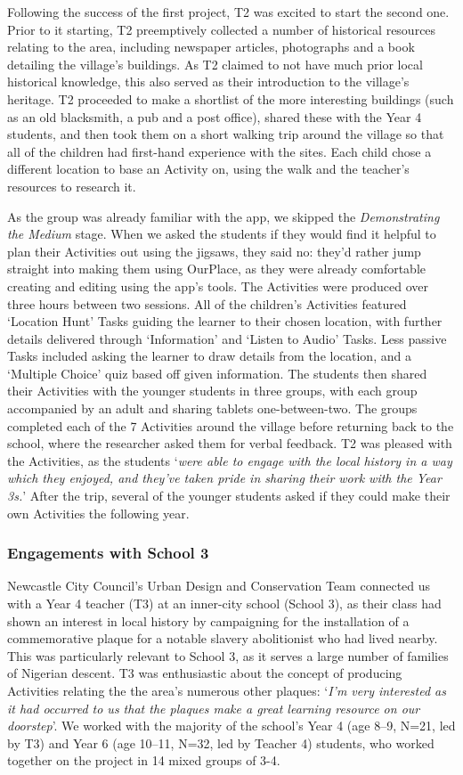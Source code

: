 \documentclass[,hyphens]{sigchi}
\begin{document}
Following the success of the first project, T2 was excited to start the second one. Prior to it starting, T2 preemptively collected a number of historical resources relating to the area, including newspaper articles, photographs and a book detailing the village's buildings. As T2 claimed to not have much prior local historical knowledge, this also served as their introduction to the village's heritage. T2 proceeded to make a shortlist of the more interesting buildings (such as an old blacksmith, a pub and a post office), shared these with the Year 4 students, and then took them on a short walking trip around the village so that all of the children had first-hand experience with the sites. Each child chose a different location to base an Activity on, using the walk and the teacher's resources to research it.

As the group was already familiar with the app, we skipped the \textit{Demonstrating the Medium} stage. When we asked the students if they would find it helpful to plan their Activities out using the jigsaws, they said no: they'd rather jump straight into making them using OurPlace, as they were already comfortable creating and editing using the app's tools. The Activities were produced over three hours between two sessions. All of the children's Activities featured `Location Hunt' Tasks guiding the learner to their chosen location, with further details delivered through `Information' and `Listen to Audio' Tasks. Less passive Tasks included asking the learner to draw details from the location, and a `Multiple Choice' quiz based off given information. The students then shared their Activities with the younger students in three groups, with each group accompanied by an adult and sharing tablets one-between-two. The groups completed each of the 7 Activities around the village before returning back to the school, where the researcher asked them for verbal feedback. T2 was pleased with the Activities, as the students `\textit{were able to engage with the local history in a way which they enjoyed, and they've taken pride in sharing their work with the Year 3s.}' After the trip, several of the younger students asked if they could make their own Activities the following year.

\subsubsection{Engagements with School 3}
Newcastle City Council's Urban Design and Conservation Team connected us with a Year 4 teacher (T3) at an inner-city school (School 3), as their class had shown an interest in local history by campaigning for the installation of a commemorative plaque for a notable slavery abolitionist who had lived nearby. This was particularly relevant to School 3, as it serves a large number of families of Nigerian descent. T3 was enthusiastic about the concept of producing Activities relating the the area's numerous other plaques: `\textit{I'm very interested as it had occurred to us that the plaques make a great learning resource on our doorstep}'. We worked with the majority of the school's Year 4 (age 8--9, N=21, led by T3) and Year 6 (age 10--11, N=32, led by Teacher 4) students, who worked together on the project in 14 mixed groups of 3-4.
\end{document}
